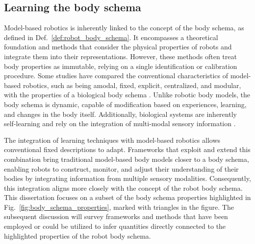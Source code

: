 \subsection{Learning the body schema}
Model-based robotics is inherently linked to the concept of the body schema, as defined in Def.~\ref{def:robot_body_schema}. It encompasses a theoretical foundation and methods that consider the physical properties of robots and integrate them into their representations. However, these methods often treat body properties as immutable, relying on a single identification or calibration procedure. Some studies have compared the conventional characteristics of model-based robotics, such as being amodal, fixed, explicit, centralized, and modular, with the properties of a biological body schema \cite{Hoffmann2021Bodymodelshumans}. Unlike robotic body models, the body schema is dynamic, capable of modification based on experiences, learning, and changes in the body itself. Additionally, biological systems are inherently self-learning and rely on the integration of multi-modal sensory information \cite{Asada2018168Proprioceptionbodyschema}.

The integration of learning techniques with model-based robotics allows conventional fixed descriptions to adapt. Frameworks that exploit and extend this combination bring traditional model-based body models closer to a body schema, enabling robots to construct, monitor, and adjust their understanding of their bodies by integrating information from multiple sensory modalities. Consequently, this integration aligns more closely with the concept of the robot body schema. This dissertation focuses on a subset of the body schema properties highlighted in Fig.~\ref{fig:body_schema_properties}, marked with triangles in the figure. The subsequent discussion will survey frameworks and methods that have been employed or could be utilized to infer quantities directly connected to the highlighted properties of the robot body schema.




